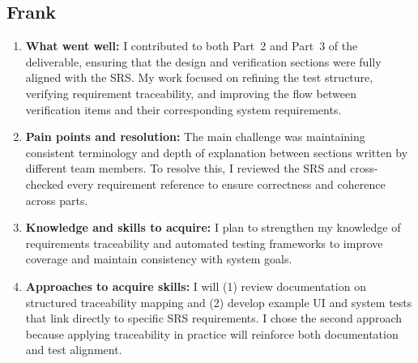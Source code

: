 \documentclass[12pt, titlepage]{article}
\begin{document}
\subsection*{Frank}
\begin{enumerate}
  \item \textbf{What went well:}
        I contributed to both Part~2 and Part~3 of the deliverable, ensuring that the design and verification
        sections were fully aligned with the SRS. My work focused on refining the test structure, verifying
        requirement traceability, and improving the flow between verification items and their
        corresponding system requirements.

  \item \textbf{Pain points and resolution:}
        The main challenge was maintaining consistent terminology and depth of explanation between
        sections written by different team members. To resolve this, I reviewed the SRS and cross-checked
        every requirement reference to ensure correctness and coherence across parts.

  \item \textbf{Knowledge and skills to acquire:}
        I plan to strengthen my knowledge of requirements traceability and automated testing frameworks
        to improve coverage and maintain consistency with system goals.

  \item \textbf{Approaches to acquire skills:}
        I will (1) review documentation on structured traceability mapping and (2) develop example UI
        and system tests that link directly to specific SRS requirements. I chose the second approach
        because applying traceability in practice will reinforce both documentation and test alignment.
\end{enumerate}
\end{document}
